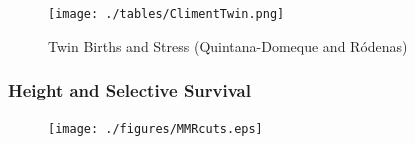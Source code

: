 \documentclass[10pt,letterpaper,subeqn]{beamer}
\begin{document}
\begin{frame}[label=USA2]

\hyperlink{c}{}
\end{frame}

\begin{frame}[label=Scotland]

\hyperlink{c}{}
\end{frame}

 \begin{frame}[label=Spain1]

\hyperlink{c}{}
\end{frame}

 \begin{frame}[label=Spain2]
\begin{figure}[htpb!]
\caption{Twin Births and Stress (Quintana-Domeque and R\'odenas)}
\centering
  \texttt{[image: ./tables/ClimentTwin.png]}
\end{figure}
\hyperlink{c}{}
\end{frame}

 \begin{frame}[label=Brazil]

\hyperlink{c}{}
\end{frame}

\begin{frame}[label=Sweden]

\hyperlink{c}{}
\end{frame}

\begin{frame}[label=TwinDeath]

\end{frame}

\begin{frame}

\hyperlink{c}{}
\end{frame}

\begin{frame}[label=surv]

\hyperlink{robust}{}
\end{frame}

\begin{frame}
\frametitle{Height and Selective Survival}
\begin{figure}[htpb!]
\centering
  \texttt{[image: ./figures/MMRcuts.eps]}
\end{figure}
\hyperlink{robust}{}
\end{frame}
\end{document}
